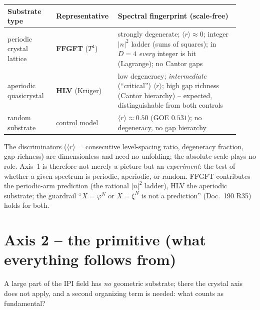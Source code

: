 \begin{center}
\small
\begin{tabular}{@{}p{0.20\linewidth}p{0.22\linewidth}p{0.50\linewidth}@{}}
\hline
\textbf{Substrate type} & \textbf{Representative} & \textbf{Spectral fingerprint (scale-free)}\\
\hline
periodic crystal lattice
& \textbf{FFGFT} ($T^4$)
& strongly degenerate; $\langle r\rangle\!\approx\!0$; integer $|n|^2$ ladder (sums of squares); in $D{=}4$ \emph{every} integer is hit (Lagrange); no Cantor gaps\\
aperiodic quasicrystal
& \textbf{HLV} (Krüger)
& low degeneracy; \emph{intermediate} (\enquote{critical}) $\langle r\rangle$; high gap richness (Cantor hierarchy) -- expected, distinguishable from both controls\\
random substrate
& control model
& $\langle r\rangle\!\approx\!0.50$ (GOE $0.531$); no degeneracy, no gap hierarchy\\
\hline
\end{tabular}
\end{center}

\noindent The discriminators ($\langle r\rangle$ = consecutive level-spacing ratio, degeneracy
fraction, gap richness) are dimensionless and need no unfolding; the absolute scale plays no role.
Axis~1 is therefore not merely a picture but an \emph{experiment}: the test of whether a given
spectrum is periodic, aperiodic, or random. FFGFT contributes the periodic-arm prediction (the
rational $|n|^2$ ladder), HLV the aperiodic substrate; the guardrail
\enquote{$X=\varphi^N$ or $X=\xi^N$ is not a prediction} (Doc.~190 R35) holds for both.

\section{Axis 2 -- the primitive (what everything follows from)}

A large part of the IPI field has \emph{no} geometric substrate; there the crystal axis does not
apply, and a second organizing term is needed: what counts as fundamental?

